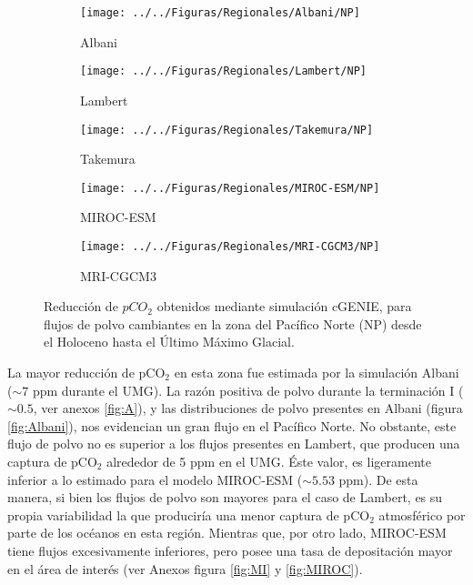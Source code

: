  \begin{figure}[H]
        \begin{subfigure}[b]{0.5\textwidth}
                \texttt{[image: ../../Figuras/Regionales/Albani/NP]}
                \caption{Albani}
                \label{fig:A_R_NP}
        \end{subfigure}%
                \begin{subfigure}[b]{0.5\textwidth}
                \texttt{[image: ../../Figuras/Regionales/Lambert/NP]}
                \caption{Lambert}
                \label{fig:L_R_NP}
        \end{subfigure}%
        
        \begin{subfigure}[b]{0.5\textwidth}
                \texttt{[image: ../../Figuras/Regionales/Takemura/NP]}
                \caption{Takemura}
                \label{fig:T_R_NP}
        \end{subfigure}%
        \begin{subfigure}[b]{0.5\textwidth}
                \texttt{[image: ../../Figuras/Regionales/MIROC-ESM/NP]}
                \caption{MIROC-ESM}
                \label{fig:MI_R_NP}
        \end{subfigure}
        
        \begin{subfigure}[b]{0.5\textwidth}
                \texttt{[image: ../../Figuras/Regionales/MRI-CGCM3/NP]}
                \caption{MRI-CGCM3}
                \label{fig:MR_R_NP}
        \end{subfigure}
        \caption[Series de reducci\'on de $pCO_2$ de flujos regionales de polvo (NP)]{Reducci\'on de $pCO_2$ obtenidos mediante simulaci\'on cGENIE, para flujos de polvo cambiantes en la zona del Pacífico Norte (NP) desde el Holoceno hasta el \'Ultimo M\'aximo Glacial.}\label{fig:NP}
\end{figure}

La mayor reducción de pCO$_2$ en esta zona fue estimada por la simulación Albani ($\sim 7$ ppm durante el UMG).
La razón positiva de polvo durante la terminación I ($\sim 0.5$, ver anexos \ref{fig:A}), y las distribuciones de polvo presentes en Albani (figura \ref{fig:Albani}), nos evidencian un gran flujo en el Pacífico Norte. No obstante, este flujo de polvo no es superior a los flujos presentes en Lambert, que producen una captura de pCO$_2$ alrededor de 5 ppm en el UMG. Éste valor, es ligeramente inferior a lo estimado para el modelo MIROC-ESM ($\sim 5.53$ ppm). De esta manera, si bien los flujos de polvo son mayores para el caso de Lambert, es su propia variabilidad la que produciría una menor captura de pCO$_2$ atmosférico por parte de los océanos en esta región. Mientras que, por otro lado, MIROC-ESM tiene flujos excesivamente inferiores, pero posee una tasa de depositación mayor en el área de interés (ver Anexos figura \ref{fig:MI} y \ref{fig:MIROC}). 

